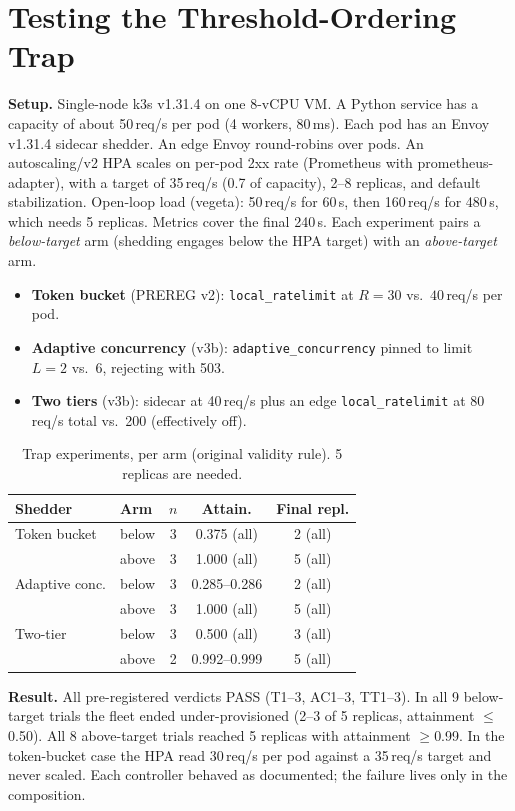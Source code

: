 \documentclass[conference]{IEEEtran}
\begin{document}
\section{Testing the Threshold-Ordering Trap}
\label{sec:testbed}

\textbf{Setup.} Single-node k3s v1.31.4 on one 8-vCPU VM. A Python service
has a capacity of about 50\,req/s per pod (4 workers, 80\,ms). Each pod has
an Envoy v1.31.4 sidecar shedder. An edge Envoy round-robins over pods. An
autoscaling/v2 HPA scales on per-pod 2xx rate (Prometheus with
prometheus-adapter), with a target of 35\,req/s (0.7 of capacity), 2--8
replicas, and default stabilization. Open-loop load (vegeta): 50\,req/s for
60\,s, then 160\,req/s for 480\,s, which needs 5 replicas. Metrics cover the
final 240\,s. Each experiment pairs a \emph{below-target} arm (shedding
engages below the HPA target) with an \emph{above-target} arm.
\begin{itemize}
\item \textbf{Token bucket} (PREREG v2): \texttt{local\_ratelimit} at $R=30$
vs.\ $40$\,req/s per pod.
\item \textbf{Adaptive concurrency} (v3b): \texttt{adaptive\_concurrency}
pinned to limit $L=2$ vs.\ $6$, rejecting with 503.
\item \textbf{Two tiers} (v3b): sidecar at 40\,req/s plus an edge
\texttt{local\_ratelimit} at 80\,req/s total vs.\ 200 (effectively off).
\end{itemize}

\begin{table}[t]
\caption{Trap experiments, per arm (original validity rule). 5 replicas are needed.}
\label{tab:testbed}
\centering\footnotesize
\begin{tabular}{@{}llccc@{}}
\toprule
Shedder & Arm & $n$ & Attain. & Final repl. \\
\midrule
Token bucket & below & 3 & 0.375 (all) & 2 (all) \\
 & above & 3 & 1.000 (all) & 5 (all) \\
Adaptive conc. & below & 3 & 0.285--0.286 & 2 (all) \\
 & above & 3 & 1.000 (all) & 5 (all) \\
Two-tier & below & 3 & 0.500 (all) & 3 (all) \\
 & above & 2 & 0.992--0.999 & 5 (all) \\
\bottomrule
\end{tabular}
\end{table}

\textbf{Result.} All pre-registered verdicts PASS (T1--3, AC1--3, TT1--3). In all
9 below-target trials the fleet ended under-provisioned (2--3 of 5 replicas,
attainment $\le$0.50). All 8 above-target trials reached 5 replicas with
attainment $\ge$0.99. In the token-bucket case the HPA read 30\,req/s per pod
against a 35\,req/s target and never scaled. Each controller behaved as
documented; the failure lives only in the composition.
\end{document}
